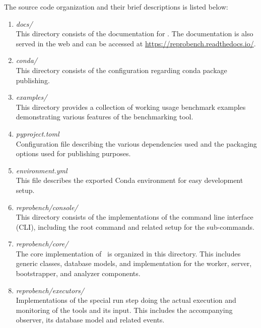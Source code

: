 The source code organization and their brief descriptions is listed below:
\begin{enumerate}
    \item \emph{docs/}\\
        This directory consists of the documentation for \OurBenchmarkingTool. The documentation is also served in the web and can be accessed at \url{https://reprobench.readthedocs.io/}.

    \item \emph{conda/}\\
        This directory consists of the configuration regarding conda package publishing.

    \item \emph{examples/}\\
        This directory provides a collection of working usage benchmark examples demonstrating various features of the benchmarking tool.

    \item \emph{pyproject.toml}\\
        Configuration file describing the various dependencies used and the packaging options used for publishing purposes.

    \item \emph{environment.yml}\\
        This file describes the exported Conda environment for easy development setup.

    \item \emph{reprobench/console/}\\
        This directory consists of the implementations of the command line interface (CLI), including the  root command and related setup for the sub-commands.

    \item \emph{reprobench/core/}\\
        The core implementation of \OurBenchmarkingTool~is organized in this directory.
        This includes generic classes, database models, and implementation for the worker, server, bootstrapper, and analyzer components.

    \item \emph{reprobench/executors/}\\
        Implementations of the special run step doing the actual execution and monitoring of the tools and its input.
        This includes the accompanying observer, its database model and related events.


\end{enumerate}
